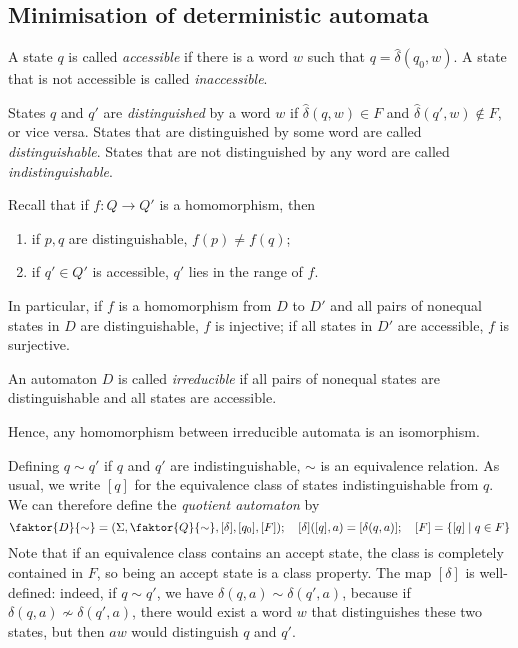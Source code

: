 \subsection{Minimisation of deterministic automata}
\begin{definition}
	A state \( q \) is called \emph{accessible} if there is a word \( w \) such that \( q = \hat \delta(q_0, w) \).
	A state that is not accessible is called \emph{inaccessible}.
\end{definition}
\begin{definition}
	States \( q \) and \( q' \) are \emph{distinguished} by a word \( w \) if \( \hat \delta(q, w) \in F \) and \( \hat \delta(q', w) \not\in F \), or vice versa.
	States that are distinguished by some word are called \emph{distinguishable}.
	States that are not distinguished by any word are called \emph{indistinguishable}.
\end{definition}
Recall that if \( f \colon Q \to Q' \) is a homomorphism, then
\begin{enumerate}
	\item if \( p, q \) are distinguishable, \( f(p) \neq f(q) \);
	\item if \( q' \in Q' \) is accessible, \( q' \) lies in the range of \( f \).
\end{enumerate}
In particular, if \( f \) is a homomorphism from \( D \) to \( D' \) and all pairs of nonequal states in \( D \) are distinguishable, \( f \) is injective; if all states in \( D' \) are accessible, \( f \) is surjective.
\begin{definition}
	An automaton \( D \) is called \emph{irreducible} if all pairs of nonequal states are distinguishable and all states are accessible.
\end{definition}
Hence, any homomorphism between irreducible automata is an isomorphism.

Defining \( q \sim q' \) if \( q \) and \( q' \) are indistinguishable, \( \sim \) is an equivalence relation.
As usual, we write \( [q] \) for the equivalence class of states indistinguishable from \( q \).
We can therefore define the \emph{quotient automaton} by
\[ \faktor{D}{\sim} = \qty(\Sigma, \faktor{Q}{\sim}, [\delta], [q_0], [F]);\quad [\delta]([q],a) = [\delta(q,a)];\quad [F] = \qty{[q] \mid q \in F} \]
Note that if an equivalence class contains an accept state, the class is completely contained in \( F \), so being an accept state is a class property.
The map \( [\delta] \) is well-defined: indeed, if \( q \sim q' \), we have \( \delta(q,a) \sim \delta(q',a) \), because if \( \delta(q,a) \not\sim \delta(q',a) \), there would exist a word \( w \) that distinguishes these two states, but then \( aw \) would distinguish \( q \) and \( q' \).

